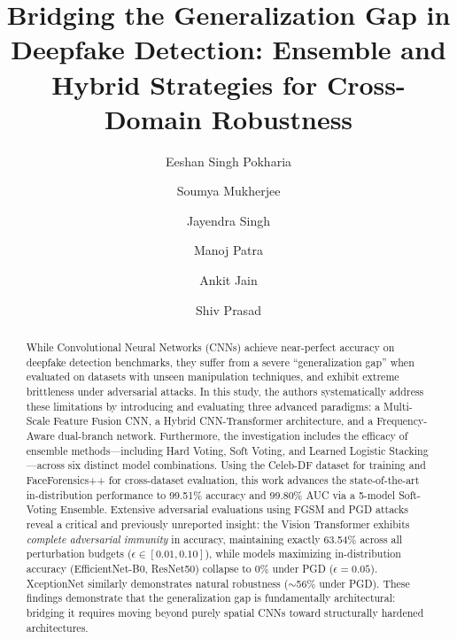 \documentclass[runningheads]{llncs}
\begin{document}

\title{Bridging the Generalization Gap in Deepfake Detection: Ensemble and Hybrid Strategies for Cross-Domain Robustness}

\author{Eeshan Singh Pokharia\orcidID{} \and
Soumya Mukherjee\orcidID{} \and
Jayendra Singh\orcidID{} \and
Manoj Patra\orcidID{} \and
Ankit Jain\orcidID{} \and
Shiv Prasad\orcidID{}}


\maketitle

\begin{abstract}
While Convolutional Neural Networks (CNNs) achieve near-perfect accuracy on deepfake detection benchmarks, they suffer from a severe ``generalization gap'' when evaluated on datasets with unseen manipulation techniques, and exhibit extreme brittleness under adversarial attacks. In this study, the authors systematically address these limitations by introducing and evaluating three advanced paradigms: a Multi-Scale Feature Fusion CNN, a Hybrid CNN-Transformer architecture, and a Frequency-Aware dual-branch network. Furthermore, the investigation includes the efficacy of ensemble methods---including Hard Voting, Soft Voting, and Learned Logistic Stacking---across six distinct model combinations. Using the Celeb-DF dataset for training and FaceForensics++ for cross-dataset evaluation, this work advances the state-of-the-art in-distribution performance to 99.51\% accuracy and 99.80\% AUC via a 5-model Soft-Voting Ensemble. Extensive adversarial evaluations using FGSM and PGD attacks reveal a critical and previously unreported insight: the Vision Transformer exhibits \textit{complete adversarial immunity} in accuracy, maintaining exactly 63.54\% across all perturbation budgets ($\epsilon \in [0.01, 0.10]$), while models maximizing in-distribution accuracy (EfficientNet-B0, ResNet50) collapse to 0\% under PGD ($\epsilon=0.05$). XceptionNet similarly demonstrates natural robustness ($\sim$56\% under PGD). These findings demonstrate that the generalization gap is fundamentally architectural: bridging it requires moving beyond purely spatial CNNs toward structurally hardened architectures.
\end{abstract}
\end{document}
